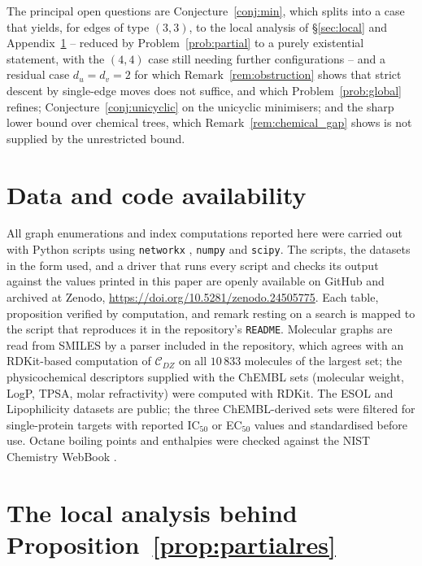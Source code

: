 \documentclass[11pt,a4paper]{article}
\theoremstyle{plain}
\theoremstyle{definition}
\theoremstyle{remark}
\newcommand{\CDZ}{\mathcal{C}_{DZ}}
\begin{document}
The principal open questions are Conjecture~\ref{conj:min}, which splits into a
case that yields, for edges of type $(3,3)$, to the local analysis of
\S\ref{sec:local} and Appendix~\ref{app:local} -- reduced by
Problem~\ref{prob:partial} to a purely existential statement, with the $(4,4)$
case still needing further configurations -- and a residual case $d_u=d_v=2$ for
which Remark~\ref{rem:obstruction} shows that strict descent by single-edge
moves does not suffice, and which Problem~\ref{prob:global} refines; Conjecture~\ref{conj:unicyclic} on the unicyclic minimisers; and the
sharp lower bound over chemical trees, which Remark~\ref{rem:chemical_gap} shows
is not supplied by the unrestricted bound.

\section*{Data and code availability}

All graph enumerations and index computations reported here were carried out
with Python scripts using \texttt{networkx} \cite{hagberg2008}, \texttt{numpy}
and \texttt{scipy}. The scripts, the datasets in the form used, and a driver
that runs every script and checks its output against the values printed in this
paper are openly available on GitHub and archived at Zenodo,
\url{https://doi.org/10.5281/zenodo.24505775}. Each table,
proposition verified by computation, and remark resting on a search is mapped to
the script that reproduces it in the repository's \texttt{README}. Molecular
graphs are read from SMILES by a parser included in the repository, which agrees
with an RDKit-based computation \cite{rdkit} of $\CDZ$ on all $10\,833$ molecules
of the largest set; the physicochemical descriptors supplied with the ChEMBL
sets (molecular weight, LogP, TPSA, molar refractivity) were computed with RDKit.
The ESOL \cite{delaney2004} and Lipophilicity \cite{wu2018} datasets are public;
the three ChEMBL-derived sets \cite{chembl2024} were filtered for single-protein
targets with reported IC$_{50}$ or EC$_{50}$ values and standardised before use.
Octane boiling points and enthalpies were checked against the NIST Chemistry
WebBook \cite{nist}.

\appendix
\section{The local analysis behind Proposition~\ref{prop:partialres}}
\label{app:local}
\end{document}
